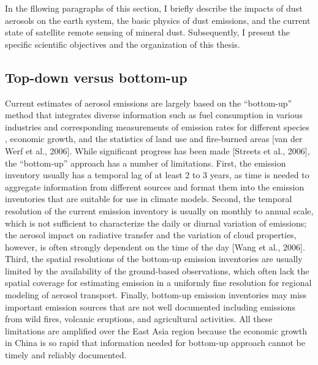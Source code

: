  In the fllowing paragraphs of this section, 
 I briefly describe the impacts of dust aerosols on the earth system, 
 the basic physics of dust emissions, 
 and the current state of satellite remote sensing of mineral dust. 
 Subsequently, I present the specific scientific objectives and the 
 organization of this thesis.  

\subsection{Top-down versus bottom-up}

 Current estimates of aerosol emissions are largely based on the “bottom-up” method 
 that integrates diverse information such as fuel consumption in various industries 
 and corresponding measurements of emission rates for different species \citep{streets03},
 economic growth, and the statistics of land use and fire-burned areas 
 [van der Werf et al., 2006]. While significant progress has been made [Streets et al., 2006], 
 the “bottom-up” approach has a number of limitations.  
 First, the emission inventory usually has a temporal lag of at least 2 to 3 years, 
 as time is needed to aggregate information from different sources 
 and format them into the emission inventories that are suitable for use in climate models. 
 Second, the temporal resolution of the current emission inventory 
 is usually on monthly to annual scale, which is not sufficient 
 to characterize the daily or diurnal variation of emissions; 
 the aerosol impact on radiative transfer and the variation of cloud properties, 
 however, is often strongly dependent on the time of the day [Wang et al., 2006]. 
 Third, the spatial resolutions of the bottom-up emission inventories are usually 
 limited by the availability of the ground-based observations, 
 which often lack the spatial coverage for estimating emission 
 in a uniformly fine resolution for regional modeling of aerosol transport. 
 Finally, bottom-up emission inventories may miss important emission sources 
 that are not well documented including emissions from wild fires, 
 volcanic eruptions, and agricultural activities. 
 All these limitations are amplified over the East Asia region 
 because the economic growth in China is so rapid that information needed 
 for bottom-up approach cannot be timely and reliably documented. 

